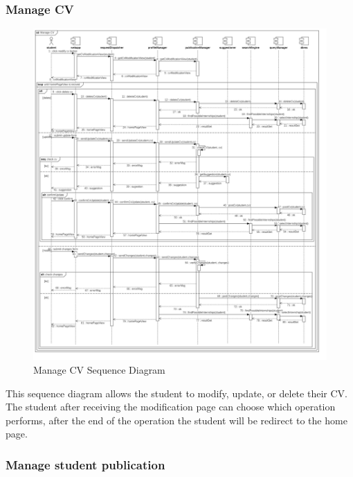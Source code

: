 \documentclass{article}
\begin{document}
\subsubsection{Manage CV}

\begin{figure}[H]
    \centering
    \includegraphics[width=1\linewidth]{SequenceDiagram/Manage CV.jpg}
    \caption{Manage CV Sequence Diagram}
    \label{fig:enter-label}
\end{figure}
This sequence diagram allows the student to modify, update, or delete their CV. 
The student after receiving the modification page can choose which operation performs, after the end of the operation the student will be redirect to the home page.

\subsubsection{Manage student publication}
\end{document}
